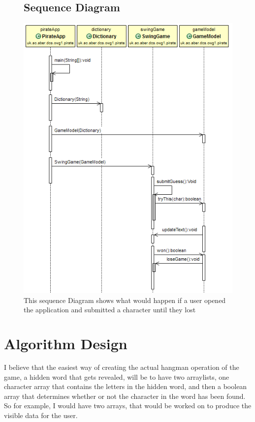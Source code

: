 \documentclass[notitlepage]{report}
\begin{document}
\begin{figure}
\subsection{Sequence Diagram}
  \centerline{\includegraphics[scale=0.7]{SequenceDiagram}}
  \caption{This sequence Diagram shows what would happen if a user opened the application and submitted a character until they lost}
  \label{fig:label}
\end{figure}

\newpage

\section{Algorithm Design}
I believe that the easiest way of creating the actual hangman operation of the game, a hidden word that gets revealed, will be to have two arraylists, one character array that contains the letters in the hidden word, and then a boolean array that determines whether or not the character in the word has been found. So for example, I would have two arrays, that would be worked on to produce the visible data for the user. 
\end{document}
